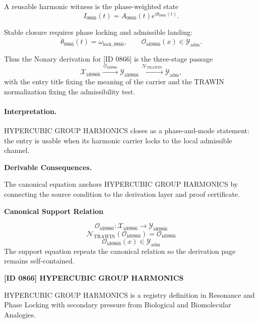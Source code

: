 A reusable harmonic witness is the phase-weighted state\[
I_{0866}(t)=A_{0866}(t)e^{i\theta_{0866}(t)}.
\]

Stable closure requires phase locking and admissible landing:\[
\dot{\theta}_{0866}(t)=\omega_{\mathrm{lock},0866},\qquad \mathcal{O}_{\mathrm{id0866}}(x)\in\mathcal{Y}_{\mathrm{adm}}.
\]

Thus the Nonary derivation for [ID 0866] is the three-stage passage
\[
\mathcal{X}_{\mathrm{id0866}}\xrightarrow{\,\mathcal{O}_{\mathrm{id0866}}\,} \mathcal{Y}_{\mathrm{id0866}}\xrightarrow{\,\mathcal{N}_{\mathrm{TRAWIN}}\,} \mathcal{Y}_{\mathrm{adm}},
\]
with the entry title fixing the meaning of the carrier and the TRAWIN normalization fixing the admissibility test.

\paragraph{Interpretation.} HYPERCUBIC GROUP HARMONICS closes as a phase-and-mode statement: the entry is usable when its harmonic carrier locks to the local admissible channel.

\par\vspace{0.35em}
\noindent\textbf{Derivable Consequences.}\quad
\begingroup
\footnotesize
\raggedright
The canonical equation anchors HYPERCUBIC GROUP HARMONICS by connecting the source condition to the derivation layer and proof certificate.
\par\endgroup

\noindent\textbf{Canonical Support Relation}\par
\[
\mathcal{O}_{\mathrm{id0866}}:\mathcal{X}_{\mathrm{id0866}}\longrightarrow\mathcal{Y}_{\mathrm{id0866}}
\]
\[
\mathcal{N}_{\mathrm{TRAWIN}}(\mathcal{O}_{\mathrm{id0866}})=\mathcal{O}_{\mathrm{id0866}}
\]
\[
\mathcal{O}_{\mathrm{id0866}}(x)\in\mathcal{Y}_{\mathrm{adm}}
\]
\noindent The support equation repeats the canonical relation so the derivation page remains self-contained.\par

\clearpage
\noindent\textbf{[ID 0866] HYPERCUBIC GROUP HARMONICS}\par
\vspace{0.35em}
\begingroup\small
{}
HYPERCUBIC GROUP HARMONICS is a registry definition in Resonance and Phase Locking with secondary pressure from Biological and Biomolecular Analogies.

